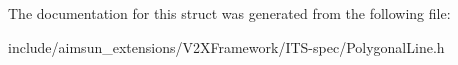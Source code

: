 The documentation for this struct was generated from the following file\+:\begin{DoxyCompactItemize}
\item 
include/aimsun\+\_\+extensions/\+V2\+X\+Framework/\+I\+T\+S-\/spec/Polygonal\+Line.\+h\end{DoxyCompactItemize}
